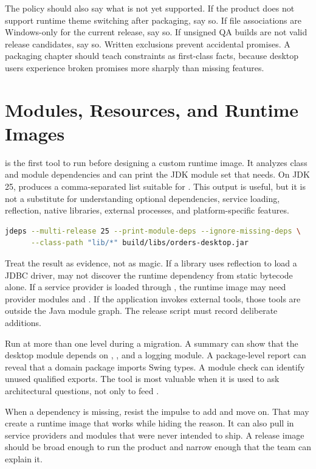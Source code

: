 The policy should also say what is not yet supported. If the product does not support runtime theme switching after packaging, say so. If file associations are Windows-only for the current release, say so. If unsigned QA builds are not valid release candidates, say so. Written exclusions prevent accidental promises. A packaging chapter should teach constraints as first-class facts, because desktop users experience broken promises more sharply than missing features.

\section{Modules, Resources, and Runtime Images}

 is the first tool to run before designing a custom runtime image. It analyzes class and module dependencies and can print the JDK module set that  needs. On JDK 25,  produces a comma-separated list suitable for . This output is useful, but it is not a substitute for understanding optional dependencies, service loading, reflection, native libraries, external processes, and platform-specific features.

\begin{lstlisting}[language=sh,caption={Analyzing dependencies before creating a runtime image.}]
jdeps --multi-release 25 --print-module-deps --ignore-missing-deps \
      --class-path "lib/*" build/libs/orders-desktop.jar
\end{lstlisting}

Treat the result as evidence, not as magic. If a library uses reflection to load a JDBC driver,  may not discover the runtime dependency from static bytecode alone. If a service provider is loaded through , the runtime image may need provider modules and . If the application invokes external tools, those tools are outside the Java module graph. The release script must record deliberate additions.

Run  at more than one level during a migration. A summary can show that the desktop module depends on , , and a logging module. A package-level report can reveal that a domain package imports Swing types. A module check can identify unused qualified exports. The tool is most valuable when it is used to ask architectural questions, not only to feed .

When a dependency is missing, resist the impulse to add  and move on. That may create a runtime image that works while hiding the reason. It can also pull in service providers and modules that were never intended to ship. A release image should be broad enough to run the product and narrow enough that the team can explain it.

